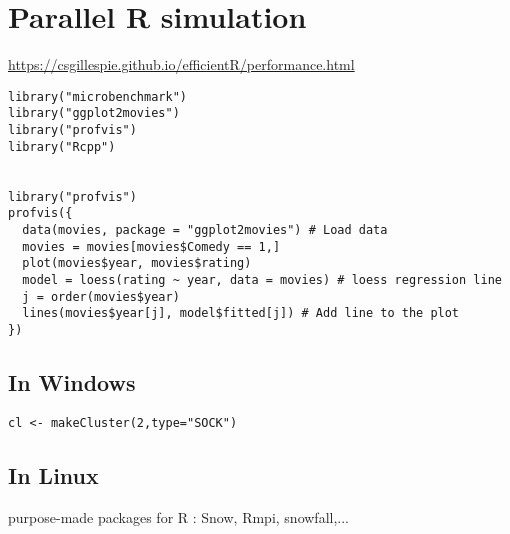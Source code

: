 
\chapter{Parallel R simulation}
\label{chap:parall-r-simul}


\url{https://csgillespie.github.io/efficientR/performance.html}

\begin{verbatim}
library("microbenchmark")
library("ggplot2movies")
library("profvis")
library("Rcpp")


library("profvis")
profvis({
  data(movies, package = "ggplot2movies") # Load data
  movies = movies[movies$Comedy == 1,]
  plot(movies$year, movies$rating)
  model = loess(rating ~ year, data = movies) # loess regression line
  j = order(movies$year)
  lines(movies$year[j], model$fitted[j]) # Add line to the plot
})
\end{verbatim}

\section{In Windows}
\label{sec:windows}

\begin{lstlisting}
cl <- makeCluster(2,type="SOCK")
\end{lstlisting}


\section{In Linux}
\label{sec:linux}

purpose-made packages for R : Snow, Rmpi, snowfall,...

